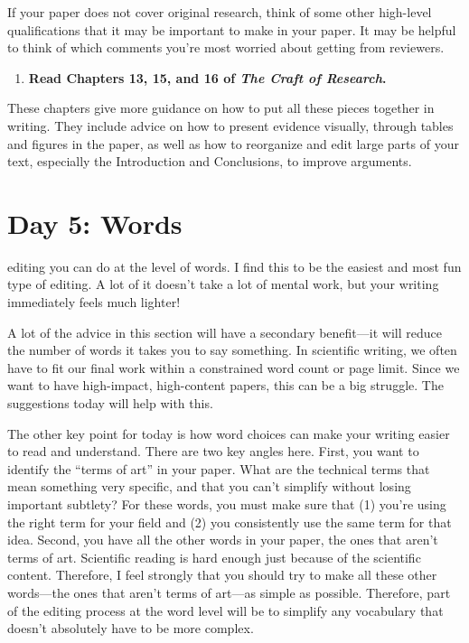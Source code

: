 \documentclass[]{tufte-book}
\providecommand{\tightlist}{%
  \setlength{\itemsep}{0pt}\setlength{\parskip}{0pt}}
\begin{document}
If your paper does not cover original research, think of some other high-level
qualifications that it may be important to make in your paper. It may be helpful
to think of which comments you're most worried about getting from reviewers.

\begin{enumerate}
\def\labelenumi{\arabic{enumi}.}
\setcounter{enumi}{14}
\tightlist
\item
  \textbf{Read Chapters 13, 15, and 16 of \emph{The Craft of Research}.}
\end{enumerate}

These chapters give more guidance on how to put all these pieces together in
writing. They include advice on how to present evidence visually, through tables
and figures in the paper, as well as how to reorganize and edit large parts of
your text, especially the Introduction and Conclusions, to improve arguments.

\hypertarget{day-5-words}{%
\chapter{Day 5: Words}\label{day-5-words}}

 editing you can do at the level
of words. I find this to be the easiest and most fun type of editing. A lot of
it doesn't take a lot of mental work, but your writing immediately feels much
lighter!

A lot of the advice in this section will have a secondary benefit---it will
reduce the number of words it takes you to say something. In scientific writing,
we often have to fit our final work within a constrained word count or page limit.
Since we want to have high-impact, high-content papers, this can be a big
struggle. The suggestions today will help with this.

The other key point for today is how word choices can make your writing
easier to read and understand. There are two key angles here. First, you want
to identify the ``terms of art'' in your paper. What are the technical terms
that mean something very specific, and that you can't simplify without losing
important subtlety? For these words, you must make sure that (1) you're using
the right term for your field and (2) you consistently use the same term for that
idea. Second, you have all the other words in your paper, the ones that aren't
terms of art. Scientific reading is hard enough just because of the scientific
content. Therefore, I feel strongly that you should try to make all these other
words---the ones that aren't terms of art---as simple as possible. Therefore,
part of the editing process at the word level will be to simplify any vocabulary
that doesn't absolutely have to be more complex.
\end{document}
